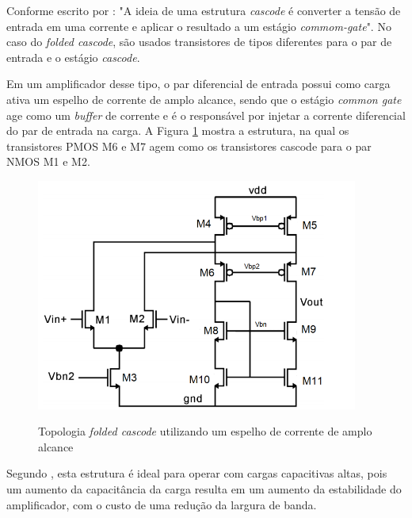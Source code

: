 \documentclass[
	12pt,				%
	oneside,			%
	a4paper,			%
	english,			%
	french,				%
	spanish,			%
	brazil				%
	]{abntex2}
\begin{document}
Conforme escrito por : "A ideia de uma estrutura \textit{cascode} é converter a tensão de entrada em uma corrente e aplicar o resultado a um estágio \textit{commom-gate}". No caso do \textit{folded cascode}, são usados transistores de tipos diferentes para o par de entrada e o estágio \textit{cascode}.

Em um amplificador desse tipo, o par diferencial de entrada possui como carga ativa um espelho de corrente de amplo alcance, sendo que o estágio \textit{common gate} age como um \textit{buffer} de corrente e é o responsável por injetar a corrente diferencial do par de entrada na carga. A Figura \ref{folded} mostra a estrutura, na qual os transistores PMOS M6 e M7 agem como os transistores cascode para o par NMOS M1 e M2.

\begin{figure}[!ht]
  \centering
  \includegraphics[width=300pt]{folded.PNG}\\
  \caption{Topologia \textit{folded cascode} utilizando um espelho de corrente de amplo alcance}\label{folded}
\end{figure}

Segundo , esta estrutura é ideal para operar com cargas capacitivas altas, pois um aumento da capacitância da carga resulta em um aumento da estabilidade do amplificador, com o custo de uma redução da largura de banda.
\end{document}
